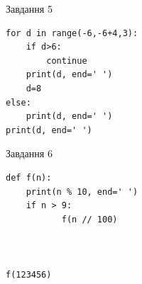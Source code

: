 \documentclass[12pt, ukrainian]{article}
\begin{document}
{\vspace{15mm}
\begin{minipage}[t]{9.7cm}                
{\begin{center}Завдання {5}\end{center}}
\begin{verbatim}
for d in range(-6,-6+4,3):
    if d>6:
        continue
    print(d, end=' ')
    d=8
else:
    print(d, end=' ')
print(d, end=' ')
\end{verbatim}     
\end{minipage}
\vline \hspace{8mm}
\begin{minipage}[t]{8.0cm}                
{\begin{center}Завдання {6}\end{center}}
\begin{verbatim}
def f(n):
    print(n % 10, end=' ')
    if n > 9:
           f(n // 100)
    


f(123456)
\end{verbatim}     
\end{minipage}

}
\newpage
\end{document}

